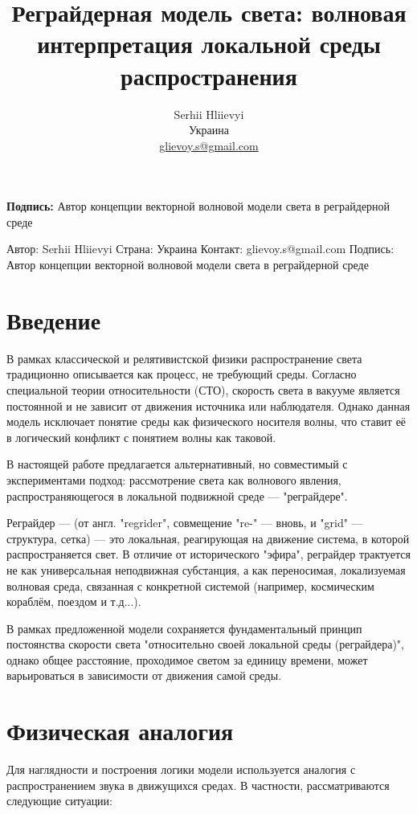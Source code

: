 \documentclass[12pt]{article}
\title{Реграйдерная модель света: волновая интерпретация локальной среды распространения}
\author{Serhii Hliievyi \\ Украина \\ \href{mailto:glievoy.s@gmail.com}{glievoy.s@gmail.com}}
\date{}
\begin{document}
\maketitle
\begin{center}\textbf{Подпись:} Автор концепции векторной волновой модели света в реграйдерной среде\end{center}

Автор: Serhii Hliievyi
Страна: Украина
Контакт: glievoy.s@gmail.com
Подпись: Автор концепции векторной волновой модели света в реграйдерной среде


\section*{Введение}

В рамках классической и релятивистской физики распространение света традиционно описывается как процесс, не требующий среды. Согласно специальной теории относительности (СТО), скорость света в вакууме является постоянной и не зависит от движения источника или наблюдателя. Однако данная модель исключает понятие среды как физического носителя волны, что ставит её в логический конфликт с понятием волны как таковой.

В настоящей работе предлагается альтернативный, но совместимый с экспериментами подход: рассмотрение света как волнового явления, распространяющегося в локальной подвижной среде — "реграйдере".

Реграйдер — (от англ. "regrider", совмещение "re-" — вновь, и "grid" — структура, сетка) — это локальная, реагирующая на движение система, в которой распространяется свет. В отличие от исторического "эфира", реграйдер трактуется не как универсальная неподвижная субстанция, а как переносимая, локализуемая волновая среда, связанная с конкретной системой (например, космическим кораблём, поездом и т.д...).

В рамках предложенной модели сохраняется фундаментальный принцип постоянства скорости света "относительно своей локальной среды (реграйдера)", однако общее расстояние, проходимое светом за единицу времени, может варьироваться в зависимости от движения самой среды.

\section*{Физическая аналогия}

Для наглядности и построения логики модели используется аналогия с распространением звука в движущихся средах. В частности, рассматриваются следующие ситуации:
\end{document}
